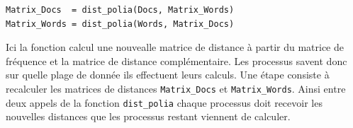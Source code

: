 \begin{verbatim}
Matrix_Docs  = dist_polia(Docs, Matrix_Words)
Matrix_Words = dist_polia(Words, Matrix_Docs)
\end{verbatim}

Ici la fonction calcul une nouvealle matrice de distance à partir du matrice de fréquence et la matrice de distance complémentaire.
Les processus savent donc sur quelle plage de donnée
ils effectuent leurs calculs.
Une étape consiste à recalculer les matrices de distances
{\tt Matrix\_Docs} et {\tt Matrix\_Words}.
Ainsi entre deux appels de la fonction {\tt dist\_polia}
chaque processus doit recevoir les nouvelles distances que
les processus restant viennent de calculer.
